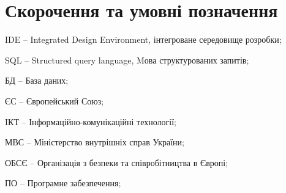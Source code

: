 \chapter*{Скорочення та умовні позначення}

IDE – Integrated Design Environment, інтегроване середовище розробки;

SQL – Structured query language, Mова структурованих запитів;

БД – База даних;

ЄС – Європейський Союз;

IКТ – Інформаційно-комунікаційні технології;

МВС – Міністерство внутрішніх справ України;

ОБСЄ – Організація з безпеки та співробітництва в Європі;

ПО – Програмне забезпечення;
